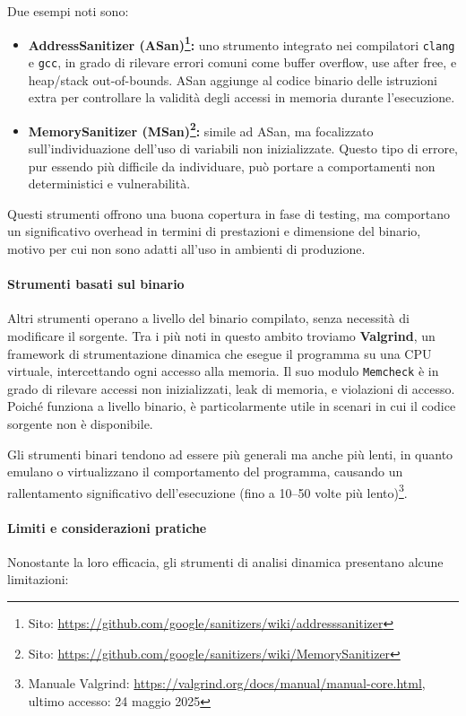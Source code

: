 \noindent
Due esempi noti sono:

\begin{itemize}
  \item \textbf{AddressSanitizer (ASan)\footnote{Sito: \url{https://github.com/google/sanitizers/wiki/addresssanitizer}}:}
    uno strumento integrato nei compilatori \texttt{clang} e \texttt{gcc}, in grado
    di rilevare errori comuni come buffer overflow, use after free, e heap/stack
    out-of-bounds. ASan aggiunge al codice binario delle istruzioni extra per
    controllare la validità degli accessi in memoria durante l'esecuzione.

  \item \textbf{MemorySanitizer (MSan)\footnote{Sito: \url{https://github.com/google/sanitizers/wiki/MemorySanitizer}}:}
    simile ad ASan, ma focalizzato sull'individuazione dell'uso di variabili non
    inizializzate. Questo tipo di errore, pur essendo più difficile da individuare,
    può portare a comportamenti non deterministici e vulnerabilità.
\end{itemize}

Questi strumenti offrono una buona copertura in fase di testing, ma comportano
un significativo overhead in termini di prestazioni e dimensione del binario, motivo
per cui non sono adatti all'uso in ambienti di produzione.

\paragraph{Strumenti basati sul binario}
Altri strumenti operano a livello del binario compilato, senza necessità di modificare
il sorgente. Tra i più noti in questo ambito troviamo \textbf{Valgrind}, un
framework di strumentazione dinamica che esegue il programma su una CPU virtuale,
intercettando ogni accesso alla memoria. Il suo modulo \texttt{Memcheck} è in grado
di rilevare accessi non inizializzati, leak di memoria, e violazioni di accesso.
Poiché funziona a livello binario, è particolarmente utile in scenari in cui il codice
sorgente non è disponibile.

Gli strumenti binari tendono ad essere più generali ma anche più lenti, in
quanto emulano o virtualizzano il comportamento del programma, causando un rallentamento
significativo dell'esecuzione (fino a 10--50 volte più lento)\footnote{Manuale
Valgrind: \url{https://valgrind.org/docs/manual/manual-core.html}, ultimo
accesso: 24 maggio 2025}.

\paragraph{Limiti e considerazioni pratiche}
Nonostante la loro efficacia, gli strumenti di analisi dinamica presentano alcune
limitazioni:

